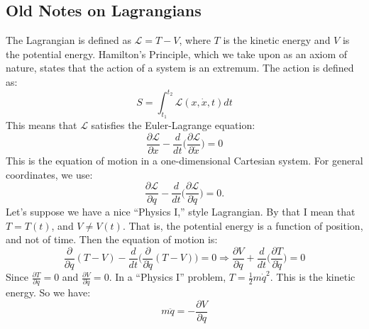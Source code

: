 \documentclass[crop=false,class=book,oneside]{standalone}
\begin{document}
        \subsection{Old Notes on Lagrangians}
        The Lagrangian is defined as $\mathcal{L}=T-V$,
        where $T$ is the kinetic energy and $V$ is the
        potential energy. Hamilton's Principle,
        which we take upon as an axiom of nature,
        states that the action of a system is an extremum.
        The action is defined as:
        \begin{equation*}
            S=\int_{t_1}^{t_2}\mathcal{L}(x,\dot{x},t)dt
        \end{equation*}This means that $\mathcal{L}$
        satisfies the Euler-Lagrange equation:
        \begin{equation*} 
            \frac{\partial \mathcal{L}}{\partial{x}}
            -
            \frac{d}{dt}\big(
                \frac{\partial\mathcal{L}}{\partial\dot{x}}
            \big)
            =0
        \end{equation*}
        This is the equation of motion in a one-dimensional
        Cartesian system. For general coordinates, we use:
        \begin{equation*}
            \frac{\partial\mathcal{L}}{\partial q}
            -\frac{d}{dt}\big(
                \frac{\partial\mathcal{L}}{\partial\dot{q}}
            \big)
            =0.
        \end{equation*}
        Let's suppose we have a nice ``Physics I,'' style Lagrangian.
        By that I mean that $T = T(t)$, and $V \ne V(t)$.
        That is, the potential energy is a function of position,
        and not of time. Then the equation of motion is:
        \begin{equation*}
            \frac{\partial}{\partial q}(T-V)-\frac{d}{dt}
            \big(\frac{\partial}{\partial\dot{q}}(T-V)\big)=0
            \Rightarrow
            \frac{\partial{V}}{\partial{q}}
            +\frac{d}{dt}\big(
                \frac{\partial{T}}{\partial\dot{q}}
            \big)
            =0
        \end{equation*}
        Since $\frac{\partial{T}}{\partial{q}}=0$
        and $\frac{\partial{V}}{\partial\dot{q}}=0$.
        In a ``Physics I'' problem, $T=\frac{1}{2}m\dot{q}^2$.
        This is the kinetic energy. So we have:
        \begin{equation}
        \nonumber m\ddot{q} = -\frac{\partial V}{\partial q}
        \end{equation}
\end{document}
